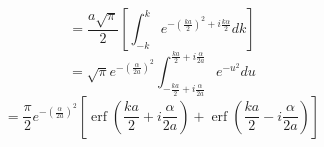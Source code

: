 \documentclass[double,12pt]{beavtex}
\begin{document}
\begin{displaymath}{=\frac{a\sqrt{\pi}}{2}\left[\int_{-k}^{k}e^{-\left(\frac{ka}{2}\right)^2 + i\frac{k\alpha}{2}}d{k}\right]}\end{displaymath} 
\begin{displaymath}{=\sqrt{\pi}e^{-\left(\frac{\alpha}{2a}\right)^2}\int_{-\frac{ka}{2}+i\frac{\alpha}{2a}}^{\frac{ka}{2}+i\frac{\alpha}{2a}}e^{-u^2}d{u}}\end{displaymath} 
\begin{equation}{=\frac{\pi}{2}e^{-\left(\frac{\alpha}{2a}\right)^2}\left[\operatorname{erf}\left(\frac{ka}{2}+i\frac{\alpha}{2a}\right)+\operatorname{erf}\left(\frac{ka}{2}-i\frac{\alpha}{2a}\right)\right]}\end{equation} 

\[{}\]
\[{}\]
\[{}\]
\end{document}
